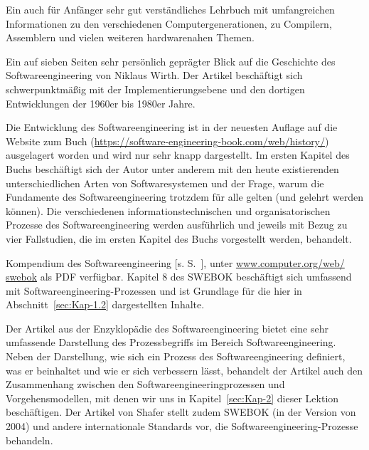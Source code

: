 {Ein auch für Anfänger sehr gut verständliches Lehrbuch mit umfangreichen Informationen zu den verschiedenen Computergenerationen, zu Compilern, Assemblern und vielen weiteren hardwarenahen Themen.}

{Ein auf sieben Seiten sehr persönlich geprägter Blick auf die Geschichte des Softwareengineering von Niklaus Wirth. Der Artikel beschäftigt sich schwerpunktmäßig mit der Implementierungsebene und den dortigen Entwicklungen der 1960er bis 1980er Jahre.}

{Die Entwicklung des Softwareengineering ist in der neuesten Auflage auf die Web\-site zum Buch (\href{https://software-engineering-book.com/web/history/}{https://software-engineering-book.com/web/history/}) ausgelagert worden und wird nur sehr knapp dargestellt. Im ersten Kapitel des Buchs beschäftigt sich der Autor unter anderem mit den heute existierenden unterschiedlichen Arten von Softwaresystemen und der Frage, warum die Fundamente des Softwareengineering trotzdem für alle gelten (und gelehrt werden können). Die verschiedenen informationstechnischen und organisatorischen Prozesse des Softwareengineering werden ausführlich und jeweils mit Bezug zu vier Fallstudien, die im ersten Kapitel des Buchs vorgestellt werden, behandelt.}

\label{sec:Kap-1.4:Bourque}
{Kompendium des Softwareengineering [s. {S.~\pageref{text:SWEBOK}}], unter \href{http://www.computer.org/web/swebok}{www.computer.org/web/ \linebreak %
		swebok} als PDF verfügbar. Kapitel 8 des SWEBOK beschäftigt sich umfassend mit Soft\-wareen\-gi\-nee\-ring-Prozessen und ist Grundlage für die hier in Abschnitt~\ref{sec:Kap-1.2} dargestellten Inhalte.}

\label{sec:Kap-1.4:Shafer}
{Der Artikel aus der Enzyklopädie des Softwareengineering \cite{lap11} bietet eine sehr umfassende Darstellung des Prozessbegriffs im Bereich Softwareengineering. Neben der Darstellung, wie sich ein Prozess des Softwareengineering definiert, was er be\-inhal\-tet und wie er sich verbessern lässt, behandelt der Artikel auch den Zusammenhang zwischen den Softwareengineeringprozessen und Vorgehensmodellen, mit denen wir uns in Kapitel~\ref{sec:Kap-2} dieser Lektion beschäftigen. Der Artikel von Shafer stellt zudem SWEBOK (in der Version von 2004) und andere internationale Standards vor, die Softwareengineering-Prozesse behandeln.}

